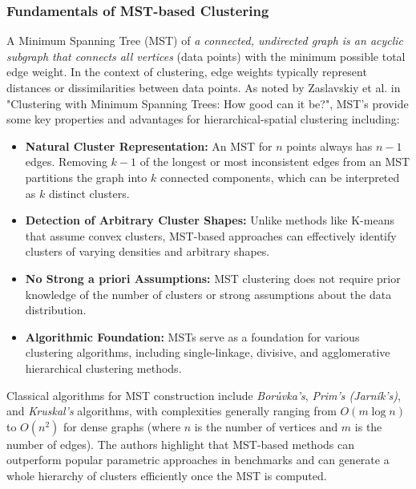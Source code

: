 \begin{multicols}{2}
\subsubsection{Fundamentals of MST-based Clustering}
A Minimum Spanning Tree (MST) of \textit{a connected, undirected graph is an acyclic subgraph that connects all vertices} (data points) with the minimum possible total edge weight. 
In the context of clustering, edge weights typically represent distances or dissimilarities between data points. As noted by Zaslavskiy et al. in "Clustering with Minimum Spanning Trees: How good can it be?"\cite{gagolewski_MST_Clustering_how_good_2024}, 
MST's provide some key properties and advantages for hierarchical-spatial clustering including:
\begin{itemize}
    \item \textbf{Natural Cluster Representation:} An MST for $n$ points always has $n-1$ edges. Removing $k-1$ of the longest or most inconsistent edges from an MST partitions the graph into $k$ connected components, which can be interpreted as $k$ distinct clusters.
    \item \textbf{Detection of Arbitrary Cluster Shapes:} Unlike methods like K-means that assume convex clusters, MST-based approaches can effectively identify clusters of varying densities and arbitrary shapes.
    \item \textbf{No Strong a priori Assumptions:} MST clustering does not require prior knowledge of the number of clusters or strong assumptions about the data distribution.
    \item \textbf{Algorithmic Foundation:} MSTs serve as a foundation for various clustering algorithms, including single-linkage, divisive, and agglomerative hierarchical clustering methods.
\end{itemize}

Classical algorithms for MST construction include \textit{Borůvka's}, \textit{Prim's (Jarník's)}, and \textit{Kruskal's} algorithms, with complexities generally ranging from $O(m \log n)$ to $O(n^2)$ for dense graphs 
(where $n$ is the number of vertices and $m$ is the number of edges). The authors highlight that MST-based methods can outperform popular parametric approaches in benchmarks and can generate a whole hierarchy of clusters efficiently once the MST is computed.


\end{multicols}
